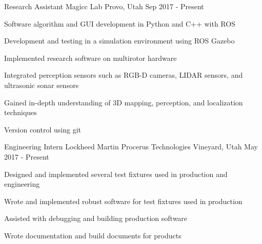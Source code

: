 
\begin{cventries}


\cventry
  {Research Assistant} %
  {Magicc Lab} %
  {Provo, Utah} %
  {Sep 2017 - Present} %
  {
    \begin{cvitems} %
      \item{Software algorithm and GUI development in Python and C++ with ROS}
      \item{Development and testing in a simulation environment using ROS Gazebo}
      \item{Implemented research software on multirotor hardware}
      \item{Integrated perception sensors such as RGB-D cameras, LIDAR sensors, and ultrasonic sonar sensors}
      \item{Gained in-depth understanding of 3D mapping, perception, and localization techniques}
      \item{Version control using git}
    \end{cvitems}
  }


  \cventry
    {Engineering Intern} %
    {Lockheed Martin Procerus Technologies} %
    {Vineyard, Utah} %
    {May 2017 - Present} %
    {
    \begin{cvitems}
      \item{Designed and implemented several test fixtures used in production and engineering}
      \item{Wrote and implemented robust software for test fixtures used in production}
      \item{Assisted with debugging and building production software}
      \item{Wrote documentation and build documents for products}
    \end{cvitems}
    }


\end{cventries}
